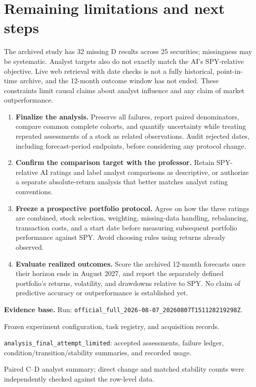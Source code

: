 \documentclass[10pt,letterpaper]{article}
\begin{document}
\section{Remaining limitations and next steps}
The archived study has 32 missing D results across 25 securities; missingness may be systematic. Analyst targets also do not exactly match the AI's SPY-relative objective. Live web retrieval with date checks is not a fully historical, point-in-time archive, and the 12-month outcome window has not ended. These constraints limit causal claims about analyst influence and any claim of market outperformance.

\begin{enumerate}
\item \textbf{Finalize the analysis.} Preserve all failures, report paired denominators, compare common complete cohorts, and quantify uncertainty while treating repeated assessments of a stock as related observations. Audit rejected dates, including forecast-period endpoints, before considering any protocol change.
\item \textbf{Confirm the comparison target with the professor.} Retain SPY-relative AI ratings and label analyst comparisons as descriptive, or authorize a separate absolute-return analysis that better matches analyst rating conventions.
\item \textbf{Freeze a prospective portfolio protocol.} Agree on how the three ratings are combined, stock selection, weighting, missing-data handling, rebalancing, transaction costs, and a start date before measuring subsequent portfolio performance against SPY. Avoid choosing rules using returns already observed.
\item \textbf{Evaluate realized outcomes.} Score the archived 12-month forecasts once their horizon ends in August 2027, and report the separately defined portfolio's returns, volatility, and drawdowns relative to SPY. No claim of predictive accuracy or outperformance is established yet.
\end{enumerate}

\vfill
{\footnotesize\color{muted}
\textbf{Evidence base.} Run: \texttt{official\_full\_2026-08-07\_20260807T151128219298Z}.\par
[1] Frozen experiment configuration, task registry, and acquisition records.\par
[2] \texttt{analysis\_final\_attempt\_limited}: accepted assessments, failure ledger, condition/transition/stability summaries, and recorded usage.\par
[3] Paired C--D analyst summary; direct change and matched stability counts were independently checked against the row-level data.}
\end{document}
